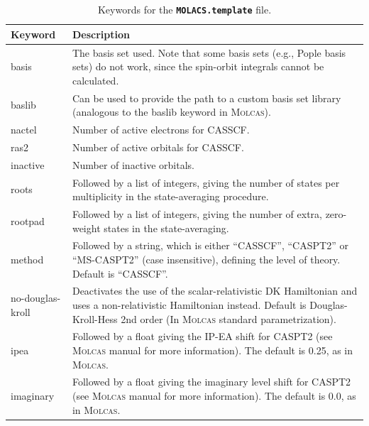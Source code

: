 \documentclass[a4paper,10pt,DIV=15,openany,twoside=false]{scrbook}
\newcommand{\ttt}[1]{\textbf{\texttt{#1}}}
\begin{document}
\begin{table}
  \centering
  \caption{Keywords for the \ttt{MOLACS.template} file.}
  \label{tab:molcas_temp}
  \begin{tabular}{>{\ttfamily}lp{12cm}}
  \toprule
  Keyword       &Description\\
  \midrule
basis           &The basis set used. Note that some basis sets (e.g., Pople basis sets) do not work, since the spin-orbit integrals cannot be calculated.\\
baslib          &Can be used to provide the path to a custom basis set library (analogous to the baslib keyword in \textsc{Molcas}).\\
nactel          &Number of active electrons for CASSCF.\\
ras2            &Number of active orbitals for CASSCF.\\
inactive        &Number of inactive orbitals.\\
roots           &Followed by a list of integers, giving the number of states per multiplicity in the state-averaging procedure.\\
rootpad         &Followed by a list of integers, giving the number of extra, zero-weight states in the state-averaging.\\
method          &Followed by a string, which is either ``CASSCF'', ``CASPT2'' or ``MS-CASPT2'' (case insensitive), defining the level of theory. Default is ``CASSCF''.\\
no-douglas-kroll&Deactivates the use of the scalar-relativistic DK Hamiltonian and uses a non-relativistic Hamiltonian instead. Default is Douglas-Kroll-Hess 2nd order  (In \textsc{Molcas} standard parametrization).\\
ipea            &Followed by a float giving the IP-EA shift for CASPT2 (see \textsc{Molcas} manual for more information). The default is 0.25, as in \textsc{Molcas}.\\
imaginary       &Followed by a float giving the imaginary level shift for CASPT2 (see \textsc{Molcas} manual for more information). The default is 0.0, as in \textsc{Molcas}.\\

\end{tabular}
\end{table}
\end{document}
